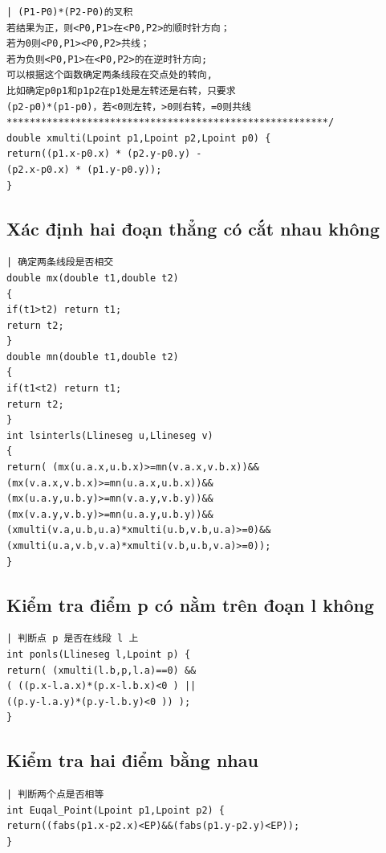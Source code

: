 \documentclass[11pt]{article}
\begin{document}
\begingroup
\scriptsize
\begin{verbatim}
| (P1-P0)*(P2-P0)的叉积
若结果为正，则<P0,P1>在<P0,P2>的顺时针方向；
若为0则<P0,P1><P0,P2>共线；
若为负则<P0,P1>在<P0,P2>的在逆时针方向;
可以根据这个函数确定两条线段在交点处的转向,
比如确定p0p1和p1p2在p1处是左转还是右转，只要求
(p2-p0)*(p1-p0)，若<0则左转，>0则右转，=0则共线
********************************************************/
double xmulti(Lpoint p1,Lpoint p2,Lpoint p0) {
return((p1.x-p0.x) * (p2.y-p0.y) -
(p2.x-p0.x) * (p1.y-p0.y));
}
\end{verbatim}
\endgroup

\subsection{Xác định hai đoạn thẳng có cắt nhau không}

\begingroup
\scriptsize
\begin{verbatim}
| 确定两条线段是否相交
double mx(double t1,double t2)
{
if(t1>t2) return t1;
return t2;
}
double mn(double t1,double t2)
{
if(t1<t2) return t1;
return t2;
}
int lsinterls(Llineseg u,Llineseg v)
{
return( (mx(u.a.x,u.b.x)>=mn(v.a.x,v.b.x))&&
(mx(v.a.x,v.b.x)>=mn(u.a.x,u.b.x))&&
(mx(u.a.y,u.b.y)>=mn(v.a.y,v.b.y))&&
(mx(v.a.y,v.b.y)>=mn(u.a.y,u.b.y))&&
(xmulti(v.a,u.b,u.a)*xmulti(u.b,v.b,u.a)>=0)&&
(xmulti(u.a,v.b,v.a)*xmulti(v.b,u.b,v.a)>=0));
}
\end{verbatim}
\endgroup

\subsection{Kiểm tra điểm p có nằm trên đoạn l không}

\begingroup
\scriptsize
\begin{verbatim}
| 判断点 p 是否在线段 l 上
int ponls(Llineseg l,Lpoint p) {
return( (xmulti(l.b,p,l.a)==0) &&
( ((p.x-l.a.x)*(p.x-l.b.x)<0 ) ||
((p.y-l.a.y)*(p.y-l.b.y)<0 )) );
}
\end{verbatim}
\endgroup

\subsection{Kiểm tra hai điểm bằng nhau}

\begingroup
\scriptsize
\begin{verbatim}
| 判断两个点是否相等
int Euqal_Point(Lpoint p1,Lpoint p2) {
return((fabs(p1.x-p2.x)<EP)&&(fabs(p1.y-p2.y)<EP));
}
\end{verbatim}
\endgroup
\end{document}
